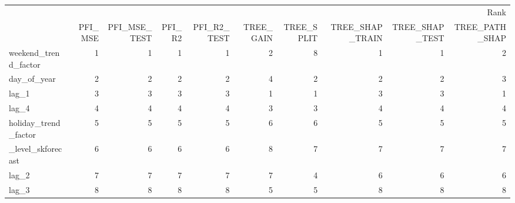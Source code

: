 \begin{tabular}{lrrrrrrrrr}
\toprule
 & \multicolumn{9}{r}{Rank} \\
 & PFI_MSE & PFI_MSE_TEST & PFI_R2 & PFI_R2_TEST & TREE_GAIN & TREE_SPLIT & TREE_SHAP_TRAIN & TREE_SHAP_TEST & TREE_PATH_SHAP \\
\midrule
weekend_trend_factor & 1 & 1 & 1 & 1 & 2 & 8 & 1 & 1 & 2 \\
day_of_year & 2 & 2 & 2 & 2 & 4 & 2 & 2 & 2 & 3 \\
lag_1 & 3 & 3 & 3 & 3 & 1 & 1 & 3 & 3 & 1 \\
lag_4 & 4 & 4 & 4 & 4 & 3 & 3 & 4 & 4 & 4 \\
holiday_trend_factor & 5 & 5 & 5 & 5 & 6 & 6 & 5 & 5 & 5 \\
_level_skforecast & 6 & 6 & 6 & 6 & 8 & 7 & 7 & 7 & 7 \\
lag_2 & 7 & 7 & 7 & 7 & 7 & 4 & 6 & 6 & 6 \\
lag_3 & 8 & 8 & 8 & 8 & 5 & 5 & 8 & 8 & 8 \\
\bottomrule
\end{tabular}
